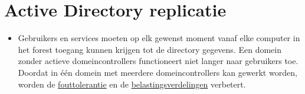 	\section{Active Directory replicatie }
	\begin{enumerate}
		 {
			\begin{itemize}
				\item Gebruikers en services moeten op elk gewenst moment vanaf elke computer in het forest toegang kunnen krijgen tot de directory gegevens. Een domein zonder actieve domeincontrollers functioneert niet langer naar gebruikers toe. Doordat in één domein met meerdere domeincontrollers kan gewerkt worden, worden de \underline{fouttolerantie} en de \underline{belastingsverdelingen} verbetert.
			\end{itemize}
		}
		

\end{enumerate}
